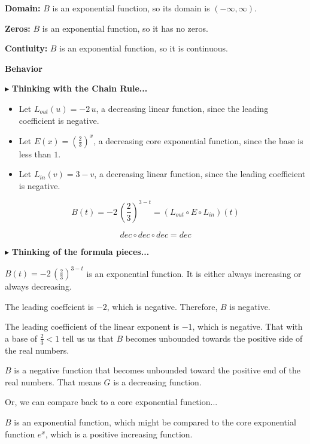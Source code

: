 \documentclass{ximera}
\begin{document}
\begin{example}
\textbf{Domain:}  $B$ is an exponential function, so its domain is $(-\infty, \infty)$.





\textbf{Zeros:}  $B$ is an exponential function, so it has no zeros.




\textbf{Contiuity:}  $B$ is an exponential function, so it is continuous.




\textbf{Behavior}



$\blacktriangleright$ \textbf{Thinking with the Chain Rule...}


\begin{itemize}
\item Let $L_{out}(u) = -2 \, u$, a decreasing linear function, since the leading coefficient is negative.
\item Let $E(x) = \left( \frac{2}{3} \right)^x$, a decreasing core exponential function, since the base is less than $1$. 
\item Let $L_{in}(v) = 3 - v$, a decreasing linear function, since the leading coefficient is negative.
\end{itemize}


\[
B(t) = -2 \, \left( \frac{2}{3} \right)^{3-t} = (L_{out} \circ E \circ L_{in})(t)
\]

\[ dec \circ dec \circ dec = dec \]




$\blacktriangleright$ \textbf{Thinking of the formula pieces...}


$B(t) = -2 \, \left( \frac{2}{3} \right)^{3-t}$ is an exponential function.  It  is either always increasing or always decreasing.


The leading coeffcient is $-2$, which is negative.  Therefore, $B$ is negative.

The leading coefficient of the linear exponent is $-1$, which is negative.  That with a base of $\frac{2}{3} < 1$ tell us us that $B$ becomes unbounded towards the positive side of the real numbers.


$B$ is a negative function that becomes unbounded toward the positive end of the real numbers.  That means $G$ is a decreasing function.



Or, we can compare back to a core exponential function...


$B$ is an exponential function, which might be compared to the core exponential function $e^x$, which is a positive increasing function.



\end{example}
\end{document}
